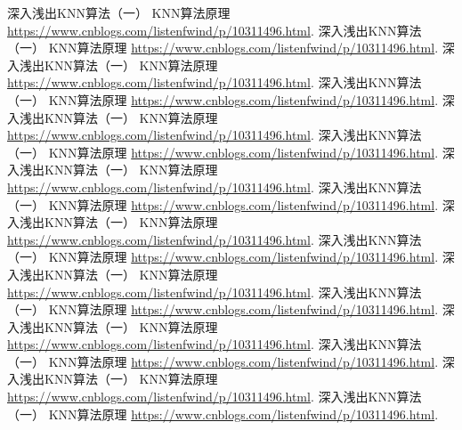 \documentclass[forprint]{report}
\begin{document}
\begin{thebibliography}{00}\thispagestyle{mybibli}

   深入浅出KNN算法（一） KNN算法原理 \url{https://www.cnblogs.com/listenfwind/p/10311496.html}.
   深入浅出KNN算法（一） KNN算法原理 \url{https://www.cnblogs.com/listenfwind/p/10311496.html}.
   深入浅出KNN算法（一） KNN算法原理 \url{https://www.cnblogs.com/listenfwind/p/10311496.html}.
   深入浅出KNN算法（一） KNN算法原理 \url{https://www.cnblogs.com/listenfwind/p/10311496.html}.
   深入浅出KNN算法（一） KNN算法原理 \url{https://www.cnblogs.com/listenfwind/p/10311496.html}.
   深入浅出KNN算法（一） KNN算法原理 \url{https://www.cnblogs.com/listenfwind/p/10311496.html}.
   深入浅出KNN算法（一） KNN算法原理 \url{https://www.cnblogs.com/listenfwind/p/10311496.html}.
   深入浅出KNN算法（一） KNN算法原理 \url{https://www.cnblogs.com/listenfwind/p/10311496.html}.
   深入浅出KNN算法（一） KNN算法原理 \url{https://www.cnblogs.com/listenfwind/p/10311496.html}.
   深入浅出KNN算法（一） KNN算法原理 \url{https://www.cnblogs.com/listenfwind/p/10311496.html}.
   深入浅出KNN算法（一） KNN算法原理 \url{https://www.cnblogs.com/listenfwind/p/10311496.html}.
   深入浅出KNN算法（一） KNN算法原理 \url{https://www.cnblogs.com/listenfwind/p/10311496.html}.
   深入浅出KNN算法（一） KNN算法原理 \url{https://www.cnblogs.com/listenfwind/p/10311496.html}.
   深入浅出KNN算法（一） KNN算法原理 \url{https://www.cnblogs.com/listenfwind/p/10311496.html}.
   深入浅出KNN算法（一） KNN算法原理 \url{https://www.cnblogs.com/listenfwind/p/10311496.html}.
   深入浅出KNN算法（一） KNN算法原理 \url{https://www.cnblogs.com/listenfwind/p/10311496.html}.

\end{thebibliography}

\cleardoublepage
\end{document}
